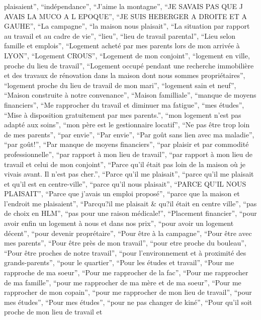\documentclass[
  letterpaper,
  DIV=11,
  numbers=noendperiod]{scrartcl}
\begin{document}
\begin{itemize}
  plaisaient'', ``indépendance'', ``J'aime la montagne'', ``JE SAVAIS
  PAS QUE J AVAIS LA MUCO A L EPOQUE'', ``JE SUIS HEBERGER A DROITE ET A
  GAUHE'', ``La campagne'', ``la maison nous plaisait'', ``La situation
  par rapport au travail et au cadre de vie'', ``lieu'', ``lieu de
  travail parental'', ``Lieu selon famille et emplois'', ``Logement
  acheté par mes parents lors de mon arrivée à LYON'', ``Logement
  CROUS'', ``Logement de mon conjoint'', ``logement en ville, proche du
  lieu de travail'', ``Logement occupé pendant une recherche immobilière
  et des travaux de rénovation dans la maison dont nous sommes
  propriétaires'', ``logement proche du lieu de travail de mon mari'',
  ``logement sain et neuf'', ``Maison construite à notre convenance'',
  ``Maison familliale'', ``manque de moyens financiers'', ``Me
  rapprocher du travail et diminuer ma fatigue'', ``mes études'', ``Mise
  à disposition gratuitement par mes parents.'', ``mon logement n'est
  pas adapté aux soins'', ``mon père est le gestionnaire locatif'', ``Ne
  pas être trop loin de mes parents'', ``par envie'', ``Par envie'',
  ``Par goût sans lien avec ma maladie'', ``par goût!'', ``Par manque de
  moyens financiers'', ``par plaisir et par commodité professionnelle'',
  ``par rapport à mon lieu de travail'', ``par rapport à mon lieu de
  travail et celui de mon conjoint'', ``Parce qu'il était pas loin de la
  maison où je vivais avant. Il n'est pas cher.'', ``Parce qu'il me
  plaisait'', ``parce qu'il me plaisait et qu'il est en centre-ville'',
  ``parce qu'il nous plaisait'', ``PARCE QU'IL NOUS PLAISAIT'', ``Parce
  que j'avais un emploi proposé'', ``parce que la maison et l'endroit me
  plaisaient'', ``Parcqu?il me plaisait \& qu?il était en centre
  ville'', ``pas de choix en HLM'', ``pas pour une raison médicale!'',
  ``Placement financier'', ``pour avoir enfin un logement à nous et dans
  nos prix'', ``pour avoir un logement décent'', ``pour devenir
  proprétaire'', ``Pour être à la campagne'', ``Pour être avec mes
  parents'', ``Pour être près de mon travail'', ``pour etre proche du
  bouleau'', ``Pour être proches de notre travail'', ``pour
  l'environnement et à proximité des grands-parents'', ``pour le
  quartier'', ``Pour les études et travail'', ``Pour me rapproche de ma
  soeur'', ``Pour me rapprocher de la fac'', ``Pour me rapprocher de ma
  famille'', ``pour me rapprocher de ma mère et de ma soeur'', ``Pour me
  rapprocher de mon copain'', ``pour me rapprocher de mon lieu de
  travail'', ``pour mes études'', ``Pour mes études'', ``pour ne pas
  changer de kiné'', ``Pour qu'il soit proche de mon lieu de travail et

\end{itemize}
\end{document}
